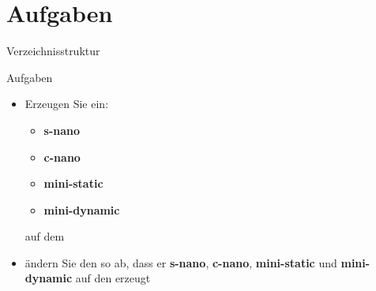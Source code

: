 \section{Aufgaben}

\begin{frame}{Verzeichnisstruktur}
\end{frame}


\begin{frame}{Aufgaben}
 \begin{itemize}
  \item Erzeugen Sie ein:
  \begin{itemize}
   \item {\bf s-nano}
   \item {\bf c-nano}
   \item {\bf mini-static}
   \item {\bf mini-dynamic}
  \end{itemize}
  auf dem \targetS\ 
  \item ändern Sie den  so ab, dass er {\bf s-nano}, {\bf c-nano}, 
  {\bf mini-static} und {\bf mini-dynamic} auf den \host erzeugt
 \end{itemize}
\end{frame}

